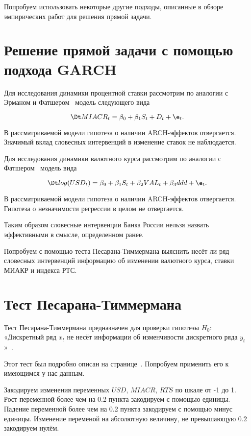 \documentclass[14pt,a4paper, oneside]{extreport}
\begin{document}
Попробуем использовать некоторые другие подходы, описанные в обзоре эмпирических работ для решения прямой задачи.

\section{Решение прямой задачи с помощью подхода GARCH}

Для исследования динамики процентной ставки рассмотрим по аналогии с Эрманом и Фатшером~\cite{ehrmann2007communication} модель следующего вида 

\begin{equation}
\Dt MIACR_t = \beta_0 + \beta_1 S_t + D_t +\e_t.
\end{equation}

В рассматриваемой модели гипотеза о наличии ARCH-эффектов отвергается. Значимый вклад словесных интервенций в изменение ставок не наблюдается.

Для исследования динамики валютного курса рассмотрим по аналогии с Фатшером~\cite{fratzscher2008communication} модель вида

\begin{equation}
\Dt log(USD_t) = \beta_0 + \beta_1 S_t + \beta_2 VAL_t + \beta_3 ddd + \e_t.
\end{equation}

В рассматриваемой модели гипотеза о наличии ARCH-эффектов отвергается. Гипотеза о незначимости регрессии в целом не отвергается.

Таким образом словесные интервенции Банка России нельзя назвать эффективными в смысле, определенном ранее.

Попробуем с помощью теста Песарана-Тиммермана выяснить несёт ли ряд словесных интервенций информацию об изменении валютного курса, ставки МИАКР и индекса РТС.

\section{Тест Песарана-Тиммермана}

Тест Песарана-Тиммермана предназначен для проверки гипотезы $H_0:$ «Дискретный ряд $x_t$ не несёт информации об изменчивости дискретного ряда $y_t$»~\cite{pesaran2000recursive}.

Этот тест был подробно описан на странице~\pageref{P_T}. Попробуем применить его к имеющимся у нас данным.

Закодируем изменения переменных $USD$, $MIACR$, $RTS$ по шкале от -1 до 1. Рост переменной более чем на 0.2 пункта закодируем с помощью единицы. Падение переменной более чем на 0.2 пункта закодируем с помощью минус единицы. Изменение переменой на абсолютную величину, не превышающую 0.2 закодируем нулём. 
\end{document}
